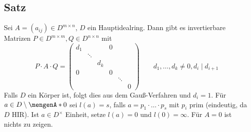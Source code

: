 \subsection[Satz: (Smith-Normalform) Invariante Faktoren einer Matrix über einem Hauptidealring]{Satz} %
\label{sub:243}
Sei $A= (a_{ij}) \in D^{m \times n}$, $D$ ein Hauptidealring. Dann gibt es invertierbare Matrizen $P  \in D^{m \times m}, Q \in D^{n \times n}$ mit 
\[
	P \cdot A \cdot Q = \begin{pmatrix}
		d_1 & & & 0 & & \\
		& \ddots & & & & \\
		& & d_k & & & \\
		0 & & & 0 & & \\
		& & & & \ddots & \\
		& & & & & 0
	\end{pmatrix}
	\qquad d_1, \ldots , d_k \not= 0, d_i \mid d_{i+1}
\]
Falls $D$ ein Körper ist, folgt dies aus dem Gauß-Verfahren und $d_i =1$.
Für $a \in D \setminus \set{0}$ sei $l(a)=s$, falls $a= p_1 \cdot \ldots \cdot p_s$ mit $p_i$ prim (eindeutig, da $D$ HIR). Ist $a \in D^\times$ Einheit, setze $l(a)=0$
und $l(0)= \infty$. Für $A=0$ ist nichts zu zeigen.

